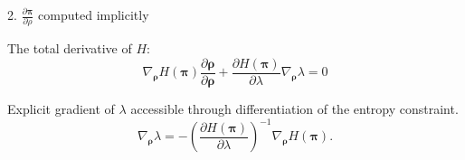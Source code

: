 \documentclass[10pt,aspectratio=169]{beamer}
\begin{document}
\begin{frame}{2. $\frac{\partial \mathbf{\pi}}{\partial \rho}$ computed implicitly}
    
    The total derivative of $H$: 
    \begin{equation}
        \nabla_{\boldsymbol{\rho}} H(\boldsymbol{\pi}) \frac{\partial \boldsymbol{\rho}}{\partial \boldsymbol{\rho}}+\frac{\partial H(\boldsymbol{\pi})}{\partial \lambda} \nabla_{\boldsymbol{\rho}} \lambda=0
    \end{equation}

    \pause
    Explicit gradient of $\lambda$ accessible through differentiation of the entropy constraint.
    \begin{equation}
        \nabla_{\bm{\rho}} \lambda =  -\left( \frac{\partial  H(\bm{\pi})}{\partial \lambda}\right)^{-1} \nabla_{\bm{\rho}} H (\bm{\pi}) .
    \end{equation}

\end{frame}



    
    
\end{document}
